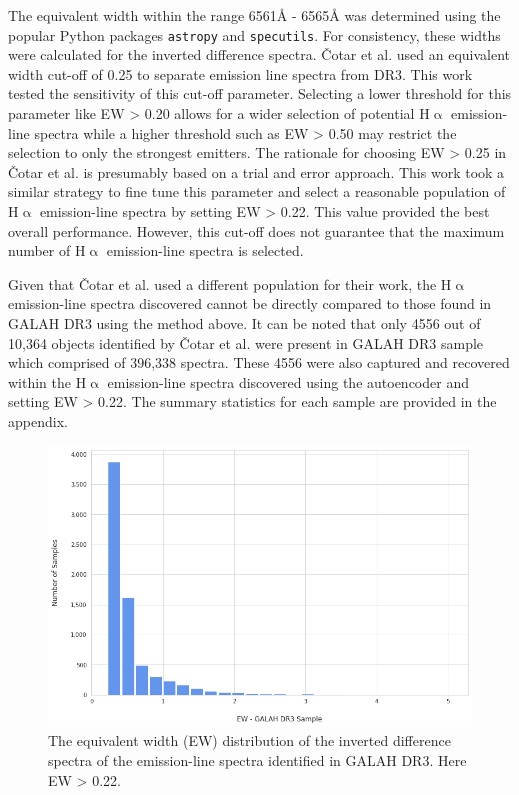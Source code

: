The equivalent width within the range 6561\r{A} - 6565\r{A} was determined using the popular Python packages \texttt{astropy}\cite{astropy:2018}\cite{astropy:2013} and \texttt{specutils}\cite{specutils}. For consistency, these widths were calculated for the inverted difference spectra. Čotar et al. used an equivalent width cut-off of 0.25 to separate emission line spectra from DR3. This work tested the sensitivity of this cut-off parameter. Selecting a lower threshold for this parameter like EW > 0.20 allows for a wider selection of potential H$\upalpha$ emission-line spectra while a higher threshold such as EW > 0.50 may restrict the selection to only the strongest emitters. The rationale for choosing EW > 0.25 in Čotar et al. is presumably based on a trial and error approach. This work took a similar strategy to fine tune this parameter and select a reasonable population of H$\upalpha$ emission-line spectra by setting EW > 0.22. This value provided the best overall performance. However, this cut-off does not guarantee that the maximum number of H$\upalpha$ emission-line spectra is selected. 

Given that Čotar et al. used a different population for their work, the H$\upalpha$ emission-line spectra discovered cannot be directly compared to those found in GALAH DR3 using the method above. It can be noted that only 4556 out of 10,364 objects identified by Čotar et al. were present in GALAH DR3 sample which comprised of 396,338 spectra. These 4556 were also captured and recovered within the H$\upalpha$ emission-line spectra discovered using the autoencoder and setting EW > 0.22. The summary statistics for each sample are provided in the appendix.

\begin{figure}[!htb]
\centering
\includegraphics[scale=0.50]{figures/EW hist.png}
\caption{The equivalent width (EW) distribution of the inverted difference spectra of the emission-line spectra identified in GALAH DR3. Here EW > 0.22.}
\end{figure}


